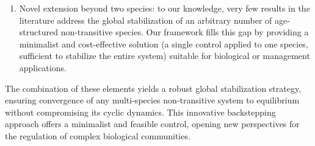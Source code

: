 \documentclass[10pt, a4paper]{amsart}
\theoremstyle{plain}
\theoremstyle{definition}
\theoremstyle{remark}
\numberwithin{equation}{section}
\begin{document}
\begin{itemize}
\begin{enumerate}
\item[*] Novel extension beyond two species: to our knowledge, very few results in the literature address the global stabilization of an arbitrary number of age-structured non-transitive species. Our framework fills this gap by providing a minimalist and cost-effective solution  (a single control applied to one species, sufficient to stabilize the entire system) suitable for biological or management applications.%
\end{enumerate}
The combination of these elements yields a robust global stabilization strategy, ensuring convergence of any multi-species non-transitive system to equilibrium without compromising its cyclic dynamics. This innovative backstepping approach offers a minimalist and feasible control, opening new perspectives for the regulation of complex biological communities.


\end{itemize}
\end{document}
